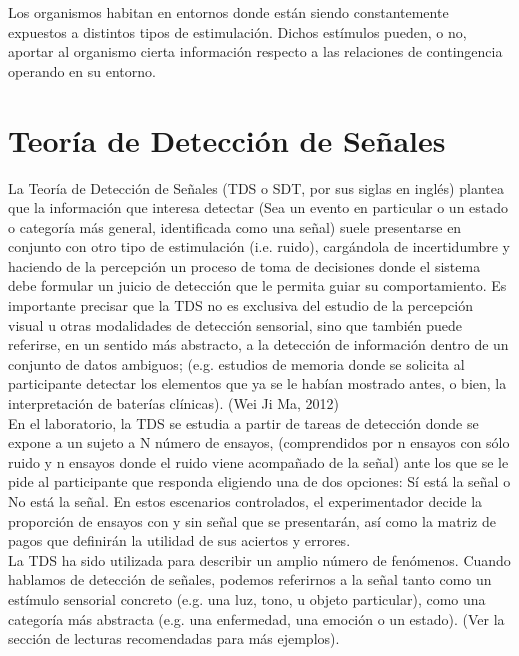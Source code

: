 Los organismos habitan en entornos donde están siendo constantemente expuestos a distintos tipos de estimulación. Dichos estímulos pueden, o no, aportar al organismo cierta información respecto a las relaciones de contingencia operando en su entorno.





\section{Teoría de Detección de Señales}

La Teoría de Detección de Señales (TDS o SDT, por sus siglas en inglés) plantea que la información que  interesa  detectar  (Sea un evento en particular o un estado o categoría más general, identificada como una señal)  suele  presentarse  en  conjunto  con  otro  tipo  de  estimulación (i.e. ruido),  cargándola  de  incertidumbre  y  haciendo de  la  percepción  un  proceso  de  toma  de decisiones  donde  el  sistema  debe  formular  un  juicio  de  detección que  le  permita  guiar  su comportamiento. Es importante precisar  que la TDS no es exclusiva del estudio de la percepción visual  u  otras  modalidades  de  detección  sensorial,  sino  que  también  puede  referirse,  en  un sentido más abstracto, a la detección de información dentro de un conjunto de datos ambiguos; (e.g.  estudios  de  memoria  donde  se  solicita  al  participante  detectar  los  elementos  que  ya  se  le habían mostrado antes, o bien, la interpretación de baterías clínicas). (Wei Ji Ma, 2012)\\

En el laboratorio, la  TDS se estudia a partir  de tareas de detección donde se expone a un  sujeto  a  N  número  de  ensayos,  (comprendidos  por  n  ensayos con  sólo  ruido  y  n  ensayos donde  el  ruido  viene  acompañado  de  la  señal)  ante  los  que  se  le  pide  al  participante  que responda eligiendo una de dos opciones: Sí está la señal o No está la señal. En estos escenarios controlados,  el  experimentador  decide  la  proporción  de  ensayos  con  y  sin  señal  que  se presentarán, así como la matriz de pagos que definirán la utilidad de sus aciertos y errores. \\

La TDS ha sido utilizada para describir un amplio número de fenómenos. Cuando hablamos de detección de señales, podemos referirnos a la señal tanto como un estímulo sensorial concreto (e.g. una luz, tono, u objeto particular), como una categoría más abstracta (e.g. una enfermedad, una emoción o un estado).  (Ver la sección de lecturas recomendadas para más ejemplos).\\


